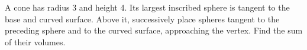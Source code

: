 A cone has radius 3 and height 4. Its largest inscribed sphere is tangent to the base and curved surface. Above it, successively place spheres tangent to the preceding sphere and to the curved surface, approaching the vertex. Find the sum of their volumes.
